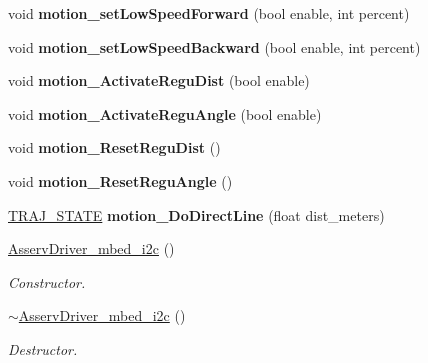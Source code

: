 \begin{DoxyCompactItemize}
void {\bfseries motion\+\_\+set\+Low\+Speed\+Forward} (bool enable, int percent)
\item 
\mbox{\label{classAsservDriver__mbed__i2c_a6d459bb635686b809447eaaf6e11fa32}} 
void {\bfseries motion\+\_\+set\+Low\+Speed\+Backward} (bool enable, int percent)
\item 
\mbox{\label{classAsservDriver__mbed__i2c_abbe122067f7bab901b67c3d148faaccd}} 
void {\bfseries motion\+\_\+\+Activate\+Regu\+Dist} (bool enable)
\item 
\mbox{\label{classAsservDriver__mbed__i2c_a4b60135063f545a6c686f360ca8c2b88}} 
void {\bfseries motion\+\_\+\+Activate\+Regu\+Angle} (bool enable)
\item 
\mbox{\label{classAsservDriver__mbed__i2c_a6bb232217e5846a7d4935d4d49d79e0f}} 
void {\bfseries motion\+\_\+\+Reset\+Regu\+Dist} ()
\item 
\mbox{\label{classAsservDriver__mbed__i2c_a717a1f7797a4aa778d3c63446746b6a6}} 
void {\bfseries motion\+\_\+\+Reset\+Regu\+Angle} ()
\item 
\mbox{\label{classAsservDriver__mbed__i2c_adf94df7551cf686e5d1e13d2e091e5fa}} 
\hyperlink{path__manager_8h_adb3360abeb29758da93865c8afcb80eb}{T\+R\+A\+J\+\_\+\+S\+T\+A\+TE} {\bfseries motion\+\_\+\+Do\+Direct\+Line} (float dist\+\_\+meters)
\item 
\mbox{\label{classAsservDriver__mbed__i2c_abf9b34729d42aecfc3f9e39377f642a1}} 
\hyperlink{classAsservDriver__mbed__i2c_abf9b34729d42aecfc3f9e39377f642a1}{Asserv\+Driver\+\_\+mbed\+\_\+i2c} ()
\begin{DoxyCompactList}\small\item\em Constructor. \end{DoxyCompactList}\item 
\mbox{\label{classAsservDriver__mbed__i2c_af142c6fa168ba03f4a3d0646a29f7ad5}} 
\hyperlink{classAsservDriver__mbed__i2c_af142c6fa168ba03f4a3d0646a29f7ad5}{$\sim$\+Asserv\+Driver\+\_\+mbed\+\_\+i2c} ()
\begin{DoxyCompactList}\small\item\em Destructor. \end{DoxyCompactList}\end{DoxyCompactItemize}
